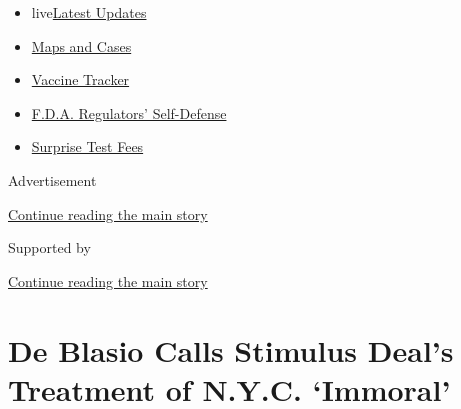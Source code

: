 \begin{itemize}
\tightlist
\item
  live\href{https://www.nytimes3xbfgragh.onion/2020/09/11/world/covid-19-coronavirus.html?name=styln-coronavirus-national\&region=TOP_BANNER\&block=storyline_menu_recirc\&action=click\&pgtype=Article\&impression_id=dc0c94b1-f4c8-11ea-b54e-f5894ce1c108\&variant=undefined}{Latest
  Updates}
\item
  \href{https://www.nytimes3xbfgragh.onion/interactive/2020/us/coronavirus-us-cases.html?name=styln-coronavirus-national\&region=TOP_BANNER\&block=storyline_menu_recirc\&action=click\&pgtype=Article\&impression_id=dc0cbbc0-f4c8-11ea-b54e-f5894ce1c108\&variant=undefined}{Maps
  and Cases}
\item
  \href{https://www.nytimes3xbfgragh.onion/interactive/2020/science/coronavirus-vaccine-tracker.html?name=styln-coronavirus-national\&region=TOP_BANNER\&block=storyline_menu_recirc\&action=click\&pgtype=Article\&impression_id=dc0cbbc1-f4c8-11ea-b54e-f5894ce1c108\&variant=undefined}{Vaccine
  Tracker}
\item
  \href{https://www.nytimes3xbfgragh.onion/2020/09/10/us/politics/fda-coronavirus-vaccine.html?name=styln-coronavirus-national\&region=TOP_BANNER\&block=storyline_menu_recirc\&action=click\&pgtype=Article\&impression_id=dc0cbbc2-f4c8-11ea-b54e-f5894ce1c108\&variant=undefined}{F.D.A.
  Regulators' Self-Defense}
\item
  \href{https://www.nytimes3xbfgragh.onion/2020/09/09/upshot/coronavirus-surprise-test-fees.html?name=styln-coronavirus-national\&region=TOP_BANNER\&block=storyline_menu_recirc\&action=click\&pgtype=Article\&impression_id=dc0cbbc3-f4c8-11ea-b54e-f5894ce1c108\&variant=undefined}{Surprise
  Test Fees}
\end{itemize}

Advertisement

\protect\hyperlink{after-top}{Continue reading the main story}

Supported by

\protect\hyperlink{after-sponsor}{Continue reading the main story}

\hypertarget{de-blasio-calls-stimulus-deals-treatment-of-nyc-immoral}{%
\section{De Blasio Calls Stimulus Deal's Treatment of N.Y.C.
`Immoral'}\label{de-blasio-calls-stimulus-deals-treatment-of-nyc-immoral}}

